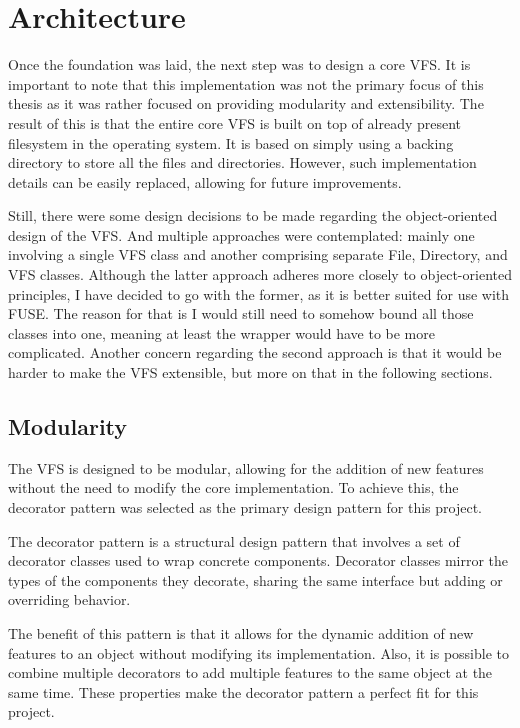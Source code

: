 \section{Architecture}\label{sec:architecture}

Once the foundation was laid, the next step was to design a core VFS\@.
It is important to note that this implementation was not the primary focus of this thesis as it was rather focused on providing modularity and extensibility.
The result of this is that the entire core VFS is built on top of already present filesystem in the operating system.
It is based on simply using a backing directory to store all the files and directories.
However, such implementation details can be easily replaced, allowing for future improvements.

Still, there were some design decisions to be made regarding the object-oriented design of the VFS\@.
And multiple approaches were contemplated: mainly one involving a single VFS class and another comprising separate File, Directory, and VFS classes.
Although the latter approach adheres more closely to object-oriented principles, I have decided to go with the former, as it is better suited for use with FUSE\@.
The reason for that is I would still need to somehow bound all those classes into one, meaning at least the wrapper would have to be more complicated.
Another concern regarding the second approach is that it would be harder to make the VFS extensible, but more on that in the following sections.

\subsection{Modularity}\label{subsec:modularity}

The VFS is designed to be modular, allowing for the addition of new features without the need to modify the core implementation.
To achieve this, the decorator pattern was selected as the primary design pattern for this project.

The decorator pattern is a structural design pattern that involves a set of decorator classes used to wrap concrete components.
Decorator classes mirror the types of the components they decorate, sharing the same interface but adding or overriding behavior.

The benefit of this pattern is that it allows for the dynamic addition of new features to an object without modifying its implementation.
Also, it is possible to combine multiple decorators to add multiple features to the same object at the same time.
These properties make the decorator pattern a perfect fit for this project.

